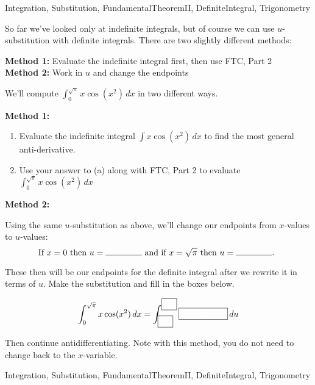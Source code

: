 \begin{tagblock}{Integration, Substitution, FundamentalTheoremII, DefiniteIntegral, Trigonometry}
\begin{question}

So far we've looked only at indefinite integrals, but of course we can use $u$-substitution with definite integrals.  There are two slightly different methods:

 \textbf{Method 1:} Evaluate the indefinite integral first, then use FTC, Part 2 \\
\textbf{Method 2:}  Work in $u$ and change the endpoints

We'll compute $\displaystyle \int_0^{\sqrt{\pi}} x \cos(x^2) \, dx$ in two different ways.

\textbf{Method 1:}
\begin{enumerate}
\item Evaluate the indefinite integral  $\displaystyle \int x \cos(x^2) \, dx$ to find the most general anti-derivative.
\vspace{1in}
\item Use your answer to (a) along with FTC, Part 2 to evaluate  $\displaystyle \int_0^{\sqrt{\pi}} x \cos(x^2) \, dx$
\vspace{1in}
\end{enumerate}

\textbf{Method 2:}  

Using the same $u$-substitution as above, we'll change our endpoints from $x$-values to $u$-values:  \\

\[ \text{If $x=0$ then $u =  \rule{1.5cm}{.1mm} $ and if $x=\sqrt{\pi}$ then $u =  \rule{1.5cm}{.1mm} $. }\]

These then will be our endpoints for the definite integral after we rewrite it in terms of $u$.  Make the substitution and fill in the boxes below.  

\[ \int_0^{\sqrt{\pi}} x \cos(x^2) \, dx= \int_{\framebox[.25in]{\textcolor{white}{A}}}^{\framebox[.25in]{\textcolor{white}{A}}}  \framebox[.8in]{\textcolor{white}{A}} \, du \]

Then continue antidifferentiating.  Note with this method, you do not need to change back to the $x$-variable.



	
	
\begin{tags}
	  Integration, Substitution, FundamentalTheoremII, DefiniteIntegral, Trigonometry
\end{tags}
	

\end{question}
\end{tagblock}
